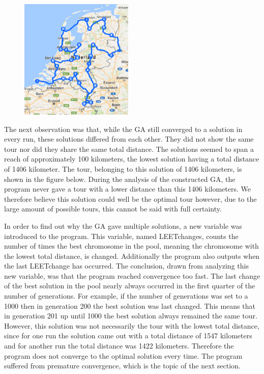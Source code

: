 \begin{figure}
	\vspace{-1cm}
	\begin{center}
		\includegraphics[width=0.48\textwidth]{1406tour}
	\end{center}	
	\label{1406tour}
\end{figure}

The next observation was that, while the GA still converged to a solution in every run, these solutions differed from each other. They did not show the same tour nor did they share the same total distance. The solutions seemed to span a reach of approximately 100 kilometers, the lowest solution having a total distance of 1406 kilometer. The tour, belonging to this solution of 1406 kilometers, is shown in the figure below. During the analysis of the constructed GA, the program never gave a tour with a lower distance than this 1406 kilometers. We therefore believe this solution could well be the optimal tour however, due to the large amount of possible tours, this cannot be said with full certainty. 

\clearpage
\par
In order to find out why the GA gave multiple solutions, a new variable was introduced to the program. This variable, named LEETchanges, counts the number of times the best chromosome in the pool, meaning the chromosome with the lowest total distance, is changed. Additionally the program also outputs when the last LEETchange has occurred. The conclusion, drawn from analyzing this new variable, was that the program reached convergence too fast. The last change of the best solution in the pool nearly always occurred in the first quarter of the number of generations. For example, if the number of generations was set to a 1000 then in generation 200 the best solution was last changed. This means that in generation 201 up until 1000 the best solution always remained the same tour. However, this solution was not necessarily the tour with the lowest total distance, since for one run the solution came out with a total distance of 1547 kilometers and for another run the total distance was 1422 kilometers. Therefore the program does not converge to the optimal solution every time. The program suffered from premature convergence, which is the topic of the next section. 

